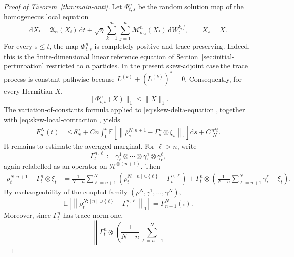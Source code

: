 \documentclass[10pt,a4paper,reqno]{amsart}
\numberwithin{equation}{section}
\theoremstyle{plain}
\theoremstyle{definition}
\theoremstyle{remark}
\renewcommand{\d}{\mathrm d}
\newcommand{\E}{\mathbb E}
\newcommand{\HH}{\mathcal H}
\newcommand{\1}{\mathbf 1}
\begin{document}
\begin{proof}[Proof of Theorem~\ref{thm:main-anti}]
Let \(\Phi_{t,s}^n\) be the random solution map of the homogeneous local equation
\[
  \d X_t
  =
  \mathfrak A_n(X_t)\,\d t
  +
  \sqrt{\eta}
  \sum_{k=1}^m\sum_{j=1}^n
  \mathcal M_{k,j}^n(X_t)\,\d W_t^{k,j},
  \qquad X_s=X.
\]
For every \(s\le t\), the map \(\Phi_{t,s}^n\) is completely positive and trace preserving. Indeed, this is the finite-dimensional linear reference equation of Section~\ref{sec:initial-perturbation} restricted to \(n\) particles.  In the present skew-adjoint case the trace process is constant pathwise because \(L^{(k)}+(L^{(k)})^*=0\). Consequently, for every Hermitian \(X\),
\begin{equation}
  \|\Phi_{t,s}^n(X)\|_1
  \le
  \|X\|_1.
  \label{eq:skew-local-contraction}
\end{equation}
The variation-of-constants formula applied to \eqref{eq:skew-delta-equation}, together with \eqref{eq:skew-local-contraction}, yields
\begin{equation}
\begin{aligned}
  F_n^N(t)
  &\le
  \delta_N^n
  +
  Cn
  \int_0^t
  \E\left[
    \left\|
      \overline\rho_s^{N:n+1}
      -
      \Gamma_s^n\otimes\xi_s
    \right\|_1
  \right]\d s
  +
  C\frac{n^2t}{N}.
\end{aligned}
  \label{eq:skew-before-average}
\end{equation}
It remains to estimate the averaged marginal. For \(\ell>n\), write
\[
  \Gamma_t^{n,\ell}
  :=
  \gamma_t^1\otimes\cdots\otimes\gamma_t^n\otimes\gamma_t^\ell,
\]
again relabelled as an operator on \(\HH^{\otimes(n+1)}\). Then
\begin{equation}
\begin{aligned}
  \overline\rho_t^{N:n+1}-\Gamma_t^n\otimes\xi_t
  &=
  \frac1{N-n}
  \sum_{\ell=n+1}^N
  \left(
    \rho_t^{N:[n]\cup\{\ell\}}
    -
    \Gamma_t^{n,\ell}
  \right)
  +
  \Gamma_t^n\otimes
  \left(
    \frac1{N-n}
    \sum_{\ell=n+1}^N
    \gamma_t^\ell
    -
    \xi_t
  \right).
\end{aligned}
  \label{eq:skew-average-decomposition}
\end{equation}
By exchangeability of the coupled family \((\rho^N,\gamma^1,\ldots,\gamma^N)\),
\[
  \E\left[
    \left\|
      \rho_t^{N:[n]\cup\{\ell\}}
      -
      \Gamma_t^{n,\ell}
    \right\|_1
  \right]
  =
  F_{n+1}^N(t).
\]
Moreover, since \(\Gamma_t^n\) has trace norm one,
\[
  \left\|
    \Gamma_t^n\otimes
    \left(
      \frac1{N-n}
      \sum_{\ell=n+1}^N
\]
\end{proof}
\end{document}
